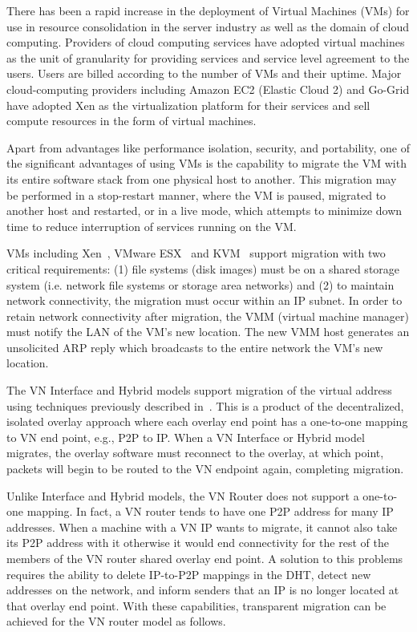 There has been a rapid increase in the deployment of Virtual Machines (VMs) for
use in resource consolidation in the server industry as well as the domain of
cloud computing.  Providers of cloud computing services have adopted virtual
machines as the unit of granularity for providing services and service level
agreement to the users.  Users are billed according to the number of VMs and
their uptime. Major cloud-computing providers including Amazon EC2 (Elastic
Cloud 2) and Go-Grid have adopted Xen as the virtualization platform for their
services and sell compute resources in the form of virtual machines.

Apart from advantages like performance isolation, security, and portability,
one of the significant advantages of using VMs is the capability to migrate the
VM with its entire software stack from one physical host to another.  This
migration may be performed in a stop-restart manner, where the VM is paused,
migrated to another host and restarted, or in a live mode, which attempts to
minimize down time to reduce interruption of services running on the VM.

VMs including Xen~\cite{xen-live}, VMware ESX~\cite{vmotion} and KVM~\cite{kvm}
support migration with two critical requirements: (1) file systems (disk
images) must be on a shared storage system (i.e. network file systems or
storage area networks) and (2) to maintain network connectivity, the migration
must occur within an IP subnet.  In order to retain network connectivity after
migration, the VMM (virtual machine manager) must notify the LAN of the VM's
new location.  The new VMM host generates an unsolicited ARP reply which
broadcasts to the entire network the VM's new location.  

The VN Interface and Hybrid models support migration of the virtual address
using techniques previously described in~\cite{ipop}.  This is a product of the
decentralized, isolated overlay approach where each overlay end point has a
one-to-one mapping to VN end point, e.g., P2P to IP.  When a VN Interface or
Hybrid model migrates, the overlay software must reconnect to the overlay, at
which point, packets will begin to be routed to the VN endpoint again,
completing migration.

Unlike Interface and Hybrid models, the VN Router does not support a one-to-one
mapping.  In fact, a VN router tends to have one P2P address for many IP
addresses.  When a machine with a VN IP wants to migrate, it cannot also take
its P2P address with it otherwise it would end connectivity for the rest of the
members of the VN router shared  overlay end point.  A solution to this
problems requires the ability to delete IP-to-P2P mappings in the DHT, detect
new addresses on the network, and inform senders that an IP is no longer
located at that overlay end point.  With these capabilities, transparent
migration can be achieved for the VN router model as follows. 

